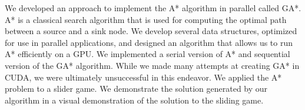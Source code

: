 
We developed an approach to implement the A* algorithm in parallel called GA*. A* is a classical search algorithm that is used for computing the optimal path between a source and a sink node. We develop several data structures, optimized for use in parallel applications, and designed an algorithm that allows us to run A* efficiently on a GPU. We implemented a serial version of A* and sequential version of the GA* algorithm. While we made many attempts at creating GA* in CUDA, we were ultimately unsuccessful in this endeavor. We applied the A* problem to a slider game. We demonstrate the solution generated by our algorithm in a visual demonstration of the solution to the sliding game.

